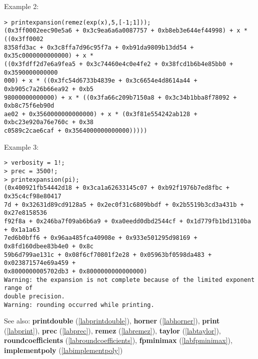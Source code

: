 \noindent Example 2: 
\begin{center}\begin{minipage}{15cm}\begin{Verbatim}[frame=single]
> printexpansion(remez(exp(x),5,[-1;1]));
(0x3ff0002eec90e5a6 + 0x3c9ea6a6a0087757 + 0xb8eb3e644ef44998) + x * ((0x3ff0002
8358fd3ac + 0x3c8ffa7d96c95f7a + 0xb91da9809b13dd54 + 0x35c0000000000000) + x * 
((0x3fdff2d7e6a9fea5 + 0x3c74460e4c0e4fe2 + 0x38fcd1b6b4e85bb0 + 0x3590000000000
000) + x * ((0x3fc54d6733b4839e + 0x3c6654e4d8614a44 + 0xb905c7a26b66ea92 + 0xb5
98000000000000) + x * ((0x3fa66c209b7150a8 + 0x3c34b1bba8f78092 + 0xb8c75f6eb90d
ae02 + 0x3560000000000000) + x * (0x3f81e554242ab128 + 0xbc23e920a76e760c + 0x38
c0589c2cae6caf + 0x3564000000000000)))))
\end{Verbatim}
\end{minipage}\end{center}
\noindent Example 3: 
\begin{center}\begin{minipage}{15cm}\begin{Verbatim}[frame=single]
> verbosity = 1!;
> prec = 3500!;
> printexpansion(pi);
(0x400921fb54442d18 + 0x3ca1a62633145c07 + 0xb92f1976b7ed8fbc + 0x35c4cf98e80417
7d + 0x32631d89cd9128a5 + 0x2ec0f31c6809bbdf + 0x2b5519b3cd3a431b + 0x27e8158536
f92f8a + 0x246ba7f09ab6b6a9 + 0xa0eedd0dbd2544cf + 0x1d779fb1bd1310ba + 0x1a1a63
7ed6b0bff6 + 0x96aa485fca40908e + 0x933e501295d98169 + 0x8fd160dbee83b4e0 + 0x8c
59b6d799ae131c + 0x08f6cf70801f2e28 + 0x05963bf0598da483 + 0x023871574e69a459 + 
0x8000000005702db3 + 0x8000000000000000)
Warning: the expansion is not complete because of the limited exponent range of 
double precision.
Warning: rounding occurred while printing.
\end{Verbatim}
\end{minipage}\end{center}
See also: \textbf{printdouble} (\ref{labprintdouble}), \textbf{horner} (\ref{labhorner}), \textbf{print} (\ref{labprint}), \textbf{prec} (\ref{labprec}), \textbf{remez} (\ref{labremez}), \textbf{taylor} (\ref{labtaylor}), \textbf{roundcoefficients} (\ref{labroundcoefficients}), \textbf{fpminimax} (\ref{labfpminimax}), \textbf{implementpoly} (\ref{labimplementpoly})
